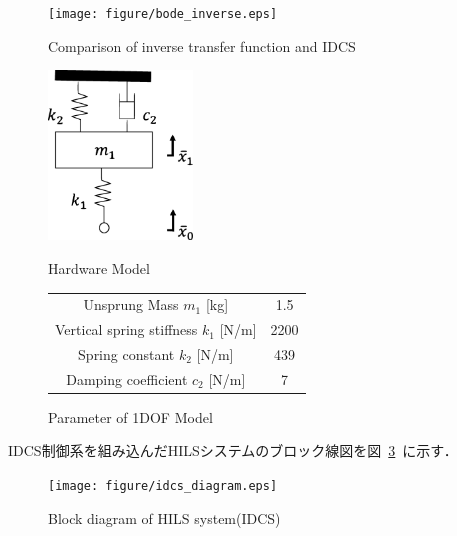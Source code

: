 \documentclass[a4paper,12pt]{article_vdlab_sotsuron}
\begin{document}
\vspace{7mm}
\begin{figure}[htp]
  \begin{center}
    \texttt{[image: figure/bode\_inverse.eps]}
    \caption{Comparison of inverse transfer function and IDCS}
    \label{fig:bode_inv_idcs}
  \end{center}
\end{figure}
\vspace{7mm}
\begin{figure}[h]
  \begin{minipage}{0.4\hsize}
     \begin{center}
      \includegraphics[height=45mm]{figure/hardware_model.eps}
	\vspace{2mm}
      \caption{Hardware Model}
      \label{fig:hardware_model}
    \end{center}
  \end{minipage}
  \vspace{7mm}
\begin{minipage}{0.6\hsize}
\makeatletter
\def\@captype{table}
\makeatother
  \begin{center}
   \caption{Parameter of 1DOF Model}
   \label{tab:parameter_1dof}
   \begin{tabular}{cc}\hline
      Unsprung Mass $m_1$ [kg] & 1.5  \\
      Vertical spring stiffness $k_1$ [N/m] & 2200  \\
      Spring constant $k_2$ [N/m] & 439   \\
      Damping coefficient $c_2$ [N/m] & 7   \\ \hline
    \end{tabular}
   \end{center}
 \end{minipage}
\end{figure}
\newpage

IDCS制御系を組み込んだHILSシステムのブロック線図を図~\ref{fig:idcs_diagram}~に示す．

\vspace*{7mm}
\begin{figure}[htp]
  \begin{center}
    \texttt{[image: figure/idcs\_diagram.eps]}
    \vspace*{3mm}
    \caption{Block diagram of HILS system(IDCS)}
    \label{fig:idcs_diagram}
  \end{center}
\end{figure}
\newpage
\end{document}
